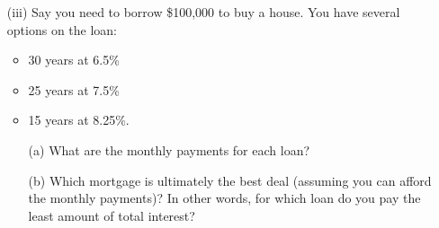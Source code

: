 \begin{exercises}
\begin{itemize}
    \item[(iii)] Say you need to borrow \$100,000 to buy a house. You have several options on the loan:
	   \begin{itemize}
	   \item 30 years at 6.5\%
	   \item 25 years at 7.5\%
	   \item 15 years at 8.25\%.
	   \end{itemize}
	   \begin{enumerate}
	   \item[(a)] What are the monthly payments for each loan?
	   \item[(b)] Which mortgage is ultimately the best deal (assuming you can afford the monthly payments)? In other words, for which loan do you pay the least amount of total interest?
	   \end{enumerate}
    \end{itemize}

\ea	


\end{exercises}


\afterexercises
